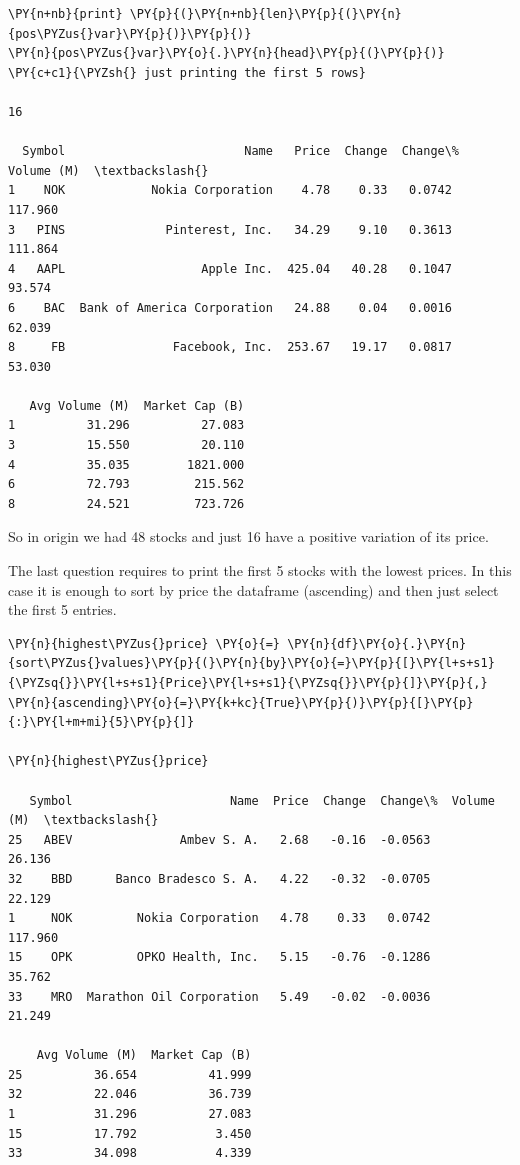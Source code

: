 \begin{Answer}
\begin{tcolorbox}[size=fbox, boxrule=1pt, colback=cellbackground, colframe=cellborder]
\begin{Verbatim}[commandchars=\\\{\}]
\PY{n+nb}{print} \PY{p}{(}\PY{n+nb}{len}\PY{p}{(}\PY{n}{pos\PYZus{}var}\PY{p}{)}\PY{p}{)}
\PY{n}{pos\PYZus{}var}\PY{o}{.}\PY{n}{head}\PY{p}{(}\PY{p}{)} \PY{c+c1}{\PYZsh{} just printing the first 5 rows}

16

  Symbol                         Name   Price  Change  Change\%  Volume (M)  \textbackslash{}
1    NOK            Nokia Corporation    4.78    0.33   0.0742     117.960
3   PINS              Pinterest, Inc.   34.29    9.10   0.3613     111.864
4   AAPL                   Apple Inc.  425.04   40.28   0.1047      93.574
6    BAC  Bank of America Corporation   24.88    0.04   0.0016      62.039
8     FB               Facebook, Inc.  253.67   19.17   0.0817      53.030

   Avg Volume (M)  Market Cap (B)
1          31.296          27.083
3          15.550          20.110
4          35.035        1821.000
6          72.793         215.562
8          24.521         723.726
\end{Verbatim}
\end{tcolorbox}
        
So in origin we had 48 stocks and just 16 have a positive variation of its price.

\Question
The last question requires to print the first 5 stocks with the lowest prices. In this case it is enough to sort by price the dataframe (ascending) and then just select the first 5 entries.

\begin{tcolorbox}[size=fbox, boxrule=1pt, colback=cellbackground, colframe=cellborder]
\begin{Verbatim}[commandchars=\\\{\}]
\PY{n}{highest\PYZus{}price} \PY{o}{=} \PY{n}{df}\PY{o}{.}\PY{n}{sort\PYZus{}values}\PY{p}{(}\PY{n}{by}\PY{o}{=}\PY{p}{[}\PY{l+s+s1}{\PYZsq{}}\PY{l+s+s1}{Price}\PY{l+s+s1}{\PYZsq{}}\PY{p}{]}\PY{p}{,} \PY{n}{ascending}\PY{o}{=}\PY{k+kc}{True}\PY{p}{)}\PY{p}{[}\PY{p}{:}\PY{l+m+mi}{5}\PY{p}{]}

\PY{n}{highest\PYZus{}price}

   Symbol                      Name  Price  Change  Change\%  Volume (M)  \textbackslash{}
25   ABEV               Ambev S. A.   2.68   -0.16  -0.0563      26.136
32    BBD      Banco Bradesco S. A.   4.22   -0.32  -0.0705      22.129
1     NOK         Nokia Corporation   4.78    0.33   0.0742     117.960
15    OPK         OPKO Health, Inc.   5.15   -0.76  -0.1286      35.762
33    MRO  Marathon Oil Corporation   5.49   -0.02  -0.0036      21.249

    Avg Volume (M)  Market Cap (B)
25          36.654          41.999
32          22.046          36.739
1           31.296          27.083
15          17.792           3.450
33          34.098           4.339
\end{Verbatim}
\end{tcolorbox}
\end{Answer}

